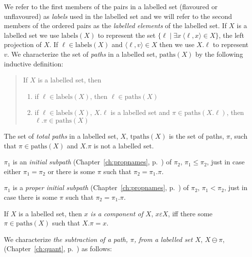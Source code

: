 We refer to the first members of the pairs in a
labelled set (flavoured or unflavoured) as \textit{labels} used in the labelled set and we will refer to
the second members of the ordered pairs as the \textit{labelled
  elements} of the labelled set.  If $X$ is a labelled set we use
$\mathrm{labels}(X)$ to represent the set $\{\ell\mid\exists 
x\ \langle\ell,x\rangle\in X\}$, the left projection of $X$.  If
$\ell\in\mathrm{labels}(X)$ and $\langle\ell,v\rangle\in X$ then we
use $X.\ell$ to represent $v$.  We characterize the set of
\textit{paths} in a labelled set, $\mathrm{paths}(X)$ by the following
inductive definition:
\begin{quote}
If $X$ is a labelled set, then
\begin{enumerate} 
 
\item if $\ell\in\mathrm{labels}(X)$, then $\ell\in\mathrm{paths}(X)$ 
 
\item if $\ell\in\mathrm{labels}(X)$, $X.\ell$ is a labelled set and
  $\pi\in\mathrm{paths}(X.\ell)$, then $\ell.\pi\in\mathrm{paths}(X)$ 
 
\end{enumerate} 
\end{quote}

The set of \textit{total paths} in a labelled set, $X$,
$\mathrm{tpaths}(X)$ is the set of paths, $\pi$, such that
\mbox{$\pi\in\mathrm{paths}(X)$} and $X.\pi$ is not a labelled set.

$\pi_1$ is an \textit{initial subpath} (Chapter~\ref{ch:propnames}, p.~\pageref{ex:subpath}) of $\pi_2$,
    $\pi_1\leq\pi_2$, just in case either $\pi_1=\pi_2$ or there is
    some $\pi$ such that $\pi_2=\pi_1.\pi$.

$\pi_1$ is a \textit{proper initial subpath}
(Chapter~\ref{ch:propnames}, p.~\pageref{ex:subpath}) of $\pi_2$,
    $\pi_1<\pi_2$, just in case there is
    some $\pi$ such that $\pi_2=\pi_1.\pi$.

If $X$ is a labelled set, then \textit{$x$ is a component of $X$},
$x\varepsilon X$, iff there some $\pi\in\mathrm{paths}(X)$ such that $X.\pi=x$.

We characterize \textit{the subtraction of a path, $\pi$, from a
  labelled set $X$}, $X\ominus\pi$,  (Chapter~\ref{ch:quant},
  p.~\pageref{ex:subtraction-labelled-sets}) as follows: 

